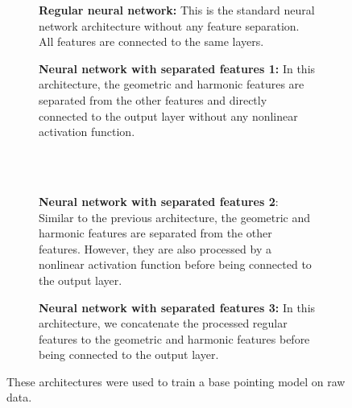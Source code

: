 \begin{figure}[H]
    \centering
    \begin{subfigure}[t]{0.49\textwidth}
        \centering
        
        \caption{\textbf{Regular neural network:}
        This is the standard neural network architecture without any feature separation.
        All features are connected to the same layers.}
        \label{subfig:regular}
    \end{subfigure}
    \hfill
   \begin{subfigure}[t]{0.49\textwidth}
       \centering
       
       \caption{\textbf{Neural network with separated features 1:}
       In this architecture, the geometric and harmonic features are separated from the other features and directly connected to the output layer without any nonlinear activation function.}
       \label{subfig:comb_sep1}
\end{subfigure}
\\~\\
    \begin{subfigure}[t]{0.49\textwidth}
        \centering
        
        \caption{\textbf{Neural network with separated features 2}:
        Similar to the previous architecture, the geometric and harmonic features are separated from the other features.
        However, they are also processed by a nonlinear activation function before being connected to the output layer.}
        \label{subfig:comb_sep2}
    \end{subfigure}
    \hfill
       \begin{subfigure}[t]{0.49\textwidth}
        \centering
        
        \caption{\textbf{Neural network with separated features 3:}
        In this architecture, we concatenate the processed regular features to the geometric and harmonic features before being connected to the output layer.}
        \label{subfig:comb_sep3}
    \end{subfigure}
     \caption{These architectures were used to train a base pointing model on raw data.}
     \label{fig:nn_architecture}
\end{figure}

